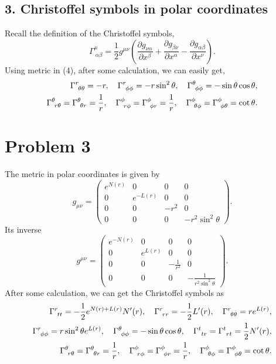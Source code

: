 \documentclass{article}
\begin{document}
\subsection*{3. Christoffel symbols in polar coordinates}
Recall the definition of the Christoffel symbols,
\begin{equation}
\Gamma^\mu_{~\alpha\beta} = \frac{1}{2} g^{\mu \nu}
\left(
\frac{\partial g_{\nu\alpha}}{\partial x^\beta} 
+ \frac{\partial g_{\beta \nu}}{\partial x^\alpha}
- \frac{\partial g_{\alpha \beta}}{\partial x^\nu}
\right).
\end{equation}
Using metric in (4), after some calculation, we can easily get,
\begin{align}
\Gamma^r_{~\theta\theta} = -r,  \quad \Gamma^r_{~\phi \phi} = -r \sin^2 \theta, \quad \Gamma^\theta_{~\phi \phi} = -\sin \theta \cos \theta,\cr
\Gamma^\theta_{~r\theta}=\Gamma^\theta_{~\theta r} = \frac{1}{r}, \quad
\Gamma^\phi_{~r \phi}= \Gamma^\phi_{~\phi r} = \frac{1}{r}, \quad
\Gamma^\phi_{~\theta \phi} = \Gamma^\phi_{~\phi \theta}=\cot \theta. 
\end{align}



\section*{Problem 3}
The metric in polar coordinates is given by
\begin{equation}
g_{\mu\nu} = 
\begin{pmatrix}
e^{N(r)} & 0 & 0 & 0 \\
0 & e^{-L(r)} & 0 & 0 \\
0 & 0 & -r^2 & 0 \\
0 & 0 & 0 & -r^2 \sin^2 \theta
\end{pmatrix}.
\end{equation}
Its inverse
\begin{equation}
g^{\mu\nu} = 
\begin{pmatrix}
e^{-N(r)} & 0 & 0 & 0 \\
0 & e^{L(r)} & 0 & 0 \\
0 & 0 & -\frac{1}{r^2} & 0 \\
0 & 0 & 0 & -\frac{1}{r^2 \sin^2 \theta}
\end{pmatrix}.
\end{equation}
After some calculation, we can get the Christoffel symbols as
\begin{align}
\Gamma^r_{~tt}=-\frac{1}{2} e^{N(r) + L(r)}N'(r), \quad 
\Gamma^r_{~rr}=-\frac{1}{2} L'(r), \quad
\Gamma^r_{~\theta\theta} = r e^{L(r)}, \cr
\Gamma^r_{~\phi\phi}= r \sin^2\theta e^{L(r)}, \quad
\Gamma^\theta_{~\phi\phi} = -\sin\theta \cos \theta, \quad
\Gamma^t_{~tr} = \Gamma^t_{~rt}=\frac{1}{2}N'(r),\cr
\Gamma^\theta_{~r \theta}=\Gamma^\theta_{~\theta r}=\frac{1}{r},\quad
\Gamma^\phi_{~r\phi}=\Gamma^\phi_{~\phi r} = \frac{1}{r},\quad
\Gamma^\phi_{~\theta \phi}=\Gamma^\phi_{~\phi \theta}=\cot \theta.
\end{align}
\end{document}
